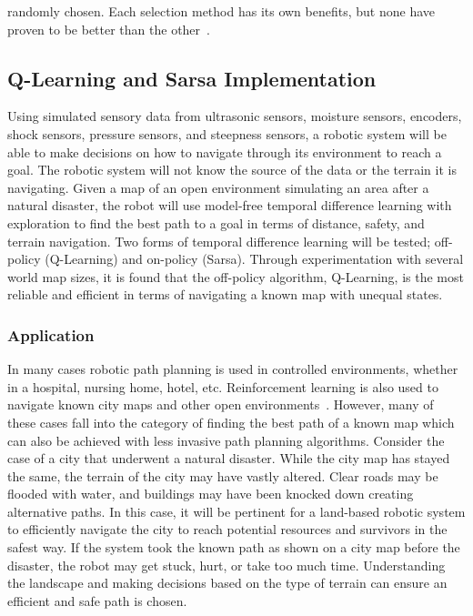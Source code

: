 \documentclass[12pt,american]{report}
\begin{document}
randomly chosen.  Each selection method has its own benefits, but none have proven to be better than the other~\cite{Eden}.


\subsection{Q-Learning and Sarsa Implementation}
Using simulated sensory data from ultrasonic sensors, moisture sensors, encoders, shock sensors, pressure sensors, and steepness sensors, a robotic system will be able to make decisions on how to navigate through its environment to reach a goal.  The robotic system will not know the source of the data or the terrain it is navigating.  Given a map of an open environment simulating an area after a natural disaster, the robot will use model-free temporal difference learning with exploration to find the best path to a goal in terms of distance, safety, and terrain navigation. Two forms of temporal difference learning will be tested; off-policy (Q-Learning) and on-policy (Sarsa). Through experimentation with several world map sizes, it is found that the off-policy algorithm, Q-Learning, is the most reliable and efficient in terms of navigating a known map with unequal states.

\subsubsection{Application}
In many cases robotic path planning is used in controlled environments, whether in a hospital, nursing home, hotel, etc. Reinforcement learning is also used to navigate known city maps and other open environments~\cite{peng2015mobile}. However, many of these cases fall into the category of finding the best path of a known map which can also be achieved with less invasive path planning algorithms. Consider the case of a city that underwent a natural disaster.  While the city map has stayed the same, the terrain of the city may have vastly altered. Clear roads may be flooded with water, and buildings may have been knocked down creating alternative paths. In this case, it will be pertinent for a land-based robotic system to efficiently navigate the city to reach potential resources and survivors in the safest way.  If the system took the known path as shown on a city map before the disaster, the robot may get stuck, hurt, or take too much time.  Understanding the landscape and making decisions based on the type of terrain can ensure an efficient and safe path is chosen.
\end{document}
